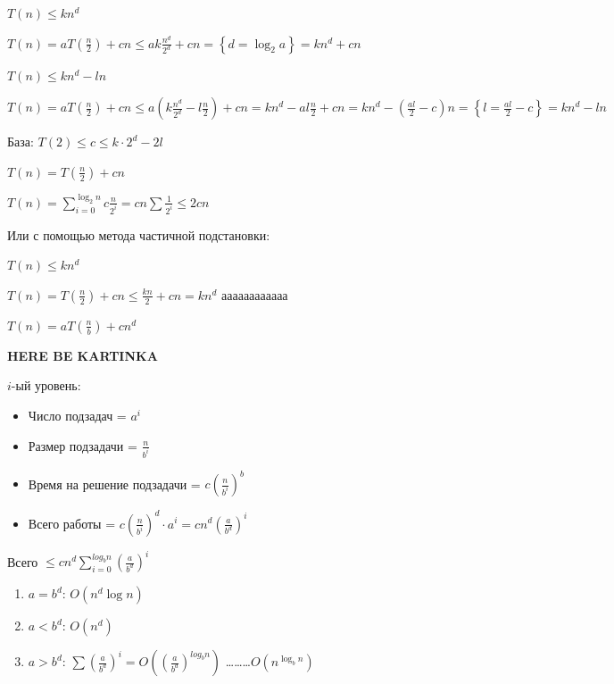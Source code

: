 \documentclass[11pt,a4paper]{article}
\begin{document}
$T(n) \leqslant kn^d$

$T(n) = aT(\frac n2) + cn \leqslant ak \frac{n^d}{2^d}+cn = \left\{ d = \log_2a \right\} = kn^d + cn$

$T(n) \leqslant kn^d - ln$

$T(n) = aT(\frac n2) + cn \leqslant a\left(k \frac{n^d}{2^d}-l\frac n2\right)+cn = kn^d - al\frac n2 + cn = kn^d - \left( \frac{al}{2} - c \right)n = \left\{ l = \frac{al}{2} - c \right\} = kn^d - ln$

База: $T(2) \leqslant c \leqslant k\cdot 2^d - 2l$

$T(n) = T\left( \frac n2 \right) + cn$

$T(n) = \sum\limits_{i=0}^{\log_2n}c\frac{n}{2^i} = cn \sum\frac{1}{2^i} \leqslant 2cn$

Или с помощью метода частичной подстановки:

$T(n) \leqslant kn^d$

$T(n) = T\left( \frac n2 \right) + cn \leqslant \frac{kn}{2} + cn = kn^d$ аааааааааааа

\vspace{1cm}
$T(n) = aT\left( \frac nb \right) + cn^d$

\vspace{1.5cm}
\textbf{HERE BE KARTINKA}
\vspace{1.5cm}

$i$-ый уровень:
\begin{itemize}
    \item Число подзадач = $a^i$
    \item Размер подзадачи = $\frac{n}{b^i}$
    \item Время на решение подзадачи = $c\left( \frac{n}{b^i} \right)^b$
    \item Всего работы = $c\left(\frac{n}{b^i}\right)^d\cdot a^i = cn^d\left(\frac{a}{b^d}\right)^i$
\end{itemize}

Всего $\leqslant cn^d \sum\limits_{i=0}^{log_bn}\left( \frac{a}{b^d} \right)^i$
\begin{enumerate}
    \item $a = b^d$: $O(n^d\log n)$
    \item $a < b^d$: $O(n^d)$
    \item $a > b^d$: $\sum \left( \frac{a}{b^d} \right)^i = O\left( \left( \frac{a}{b^d} \right)^{log_bn} \right)$ \dots\dots\dots $O\left( n^{\log_bn} \right)$
\end{enumerate}
\end{document}
